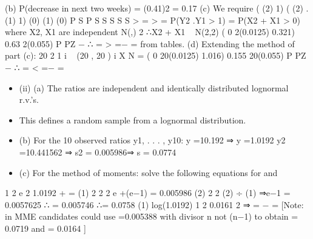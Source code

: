\documentclass[a4paper,12pt]{article}
\begin{document}
(b) P(decrease in next two weeks) = (0.41)2 = 0.17
(c) We require ( (2) 1) ( (2) . (1) 1)
(0) (1) (0)
P S P S S
S S S
> = >
= P(Y2 .Y1 > 1) = P(X2 + X1 > 0)
where X2, X1 are independent N(\mu,)
2
∴X2 + X1 ~ N(2\mu,2\sum )
( 0 2(0.0125) 0.321) 0.63
2(0.055)
P PZ −
∴ = > =− = from tables.
(d) Extending the method of part (c):
20
2
1
i ~ (20 , 20 )
i
X N
=
\sum \mu \sum
( 0 20(0.0125) 1.016) 0.155
20(0.055)
P PZ −
∴ = < =− =
\begin{itemize}
    \item (ii) (a) The ratios are independent and identically distributed lognormal r.v.’s.
\item This defines a random sample from a lognormal distribution.
\item (b) For the 10 observed ratios y1, . . . , y10:
\sum y =10.192 ⇒ y =1.0192
\sum y2 =10.441562 ⇒ s2 = 0.005986⇒ s = 0.0774
\item (c) For the method of moments:
solve the following equations for \mu and 
\end{itemize}


1 2
e 2 1.0192
\mu+ \sum
= (1)
2 2 2 e \mu+\sum (e\sum −1) = 0.005986 (2)
2 2 (2) ÷ (1) ⇒e\sum −1 = 0.0057625
∴ = 0.005746 ∴\sum = 0.0758
(1) log(1.0192) 1 2 0.0161
2
⇒ \mu = − \sum =
[Note: in MME candidates could use  =0.005388 with divisor n not
(n−1) to obtain \sum = 0.0719 and \mu = 0.0164 ]
\end{document}
